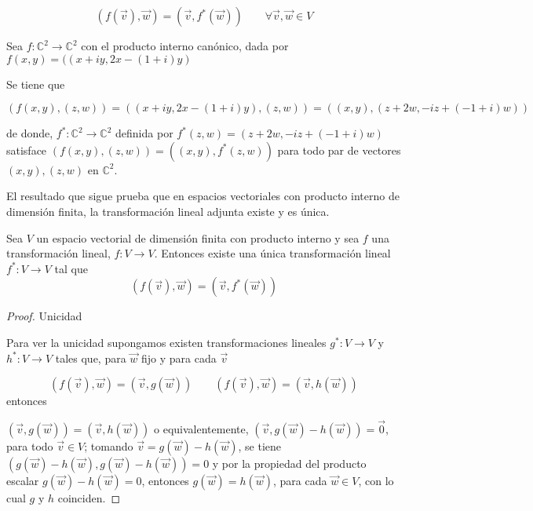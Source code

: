 {\begin{definition}
 \begin{equation}
(f(\vec{v}),\vec{w})=(\vec{v},f ^{*}(\vec{w})) \qquad  \forall \vec{v},\vec{w}\in V
 \label{230}
\end{equation}
\end{definition}


\bigskip


\begin{example} 
\label{ejemplotadjunta}


Sea $f: \mathbb{C}^{2}\rightarrow  \mathbb{C}^{2}$ con el producto interno canónico, dada por 
$f(x,y)=((x+iy, 2x-(1+i)y)$


\bigskip


Se tiene que

\bigskip


$(f(x,y),(z,w))= ((x+iy, 2x-(1+i)y),(z,w) )= ((x,y), (z+2w,-iz+(-1+i)w))$ 

\bigskip
\noindent
de donde, $f ^{*}:  \mathbb{C}^{2}\rightarrow  \mathbb{C}^{2}  $ definida por $f ^{*}(z,w)=(z+2w, -iz+(-1+i)w)$ satisface 
$(f(x,y),(z,w))=((x,y),f ^{*}(z,w))$ para todo par de vectores $(x,y),(z,w)$ en $\mathbb{C}^{2}$.
\end{example}
\bigskip

  




El resultado que sigue prueba que  en espacios vectoriales   con producto interno de dimensión finita,   la transformación lineal adjunta existe y es única. 





\bigskip
\begin{theorem}

Sea $V$ un espacio vectorial de dimensión finita  con producto interno y sea $f$ una transformación lineal, $f: V \rightarrow V$. Entonces existe una única transformación lineal $f ^{*}: V \rightarrow V  $ tal que $$(f(\vec{v}),\vec{w})=(\vec{v},f ^{*}(\vec{w}))$$ 

\begin{proof}
Unicidad

Para ver la unicidad supongamos existen transformaciones lineales $g^{*}: V \rightarrow V$ y  $ h^{*}: V \rightarrow V $ tales que, para $\vec{w}$ fijo y para cada $\vec{v}$

$$ (f(\vec{v}), \vec{w})= (\vec{v},g(\vec{w}) )\qquad  (f(\vec{v}), \vec{w})= (\vec{v},h(\vec{w}))  $$
entonces 


$(\vec{v},g(\vec{w}))=(\vec{v},h(\vec{w}))$  o equivalentemente, $(\vec{v},g(\vec{w})-h(\vec{w}))=\vec{0}$, para todo $\vec{v} \in V$; tomando $ \vec{v}= g(\vec{w})-h(\vec{w})$, se tiene $(g(\vec{w})-h(\vec{w}),g(\vec{w})-h(\vec{w}))=0 $ y por la propiedad del producto escalar $g(\vec{w})-h(\vec{w})=0$, entonces $g(\vec{w})=h(\vec{w})$, para cada $\vec{w} \in V $, con lo cual $g$ y $h$ coinciden.


\end{proof}
\end{theorem}}
